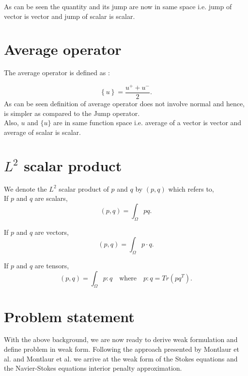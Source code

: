 \documentclass[a4paper,twoside,openright]{book}
\begin{document}
As can be seen the quantity and its jump are now in same space i.e. jump of vector is vector and jump of scalar is scalar.

\section{Average operator}

The average operator is defined as :

\begin{equation}\label{average operator}
\left\lbrace u \right\rbrace = \frac{u^+ + u^-}{2} \textrm{.}
\end{equation} 
\noindent
As can be seen definition of average operator does not involve normal and hence, is simpler as compared to the Jump operator.\\
Also, $u$ and $\lbrace u \rbrace$ are in same function space i.e. average of a vector is vector and average of scalar is scalar.\\

\section{$L^2$ scalar product}

We denote the $L^2$ scalar product of $p$ and $q$ by $(p,q)$ which refers to,\\

If $p$ and $q$ are scalars,
\begin{equation}\label{inner product scalars}
(p,q)=\int_{\Omega} pq \textrm{.}
\end{equation}

If $p$ and $q$ are vectors,
\begin{equation}\label{Inner product vectors}
(p,q)=\int_{\Omega} p \cdot q \textrm{.}
\end{equation}

If $p$ and $q$ are tensors,
\begin{equation}\label{Inner product tensors}
(p,q)=\int_{\Omega} p : q \quad \textrm{where} \quad p:q = Tr(pq^T) \textrm{.}
\end{equation}

\section{Problem statement}

With the above background, we are now ready to derive weak formulation and define problem in weak form. Following the approach presented by Montlaur et al. \cite{Montlaur} and Montlaur et al. \cite{Montlaur2} we arrive at the weak form of the Stokes equations and the Navier-Stokes equations interior penalty approximation.
\end{document}
